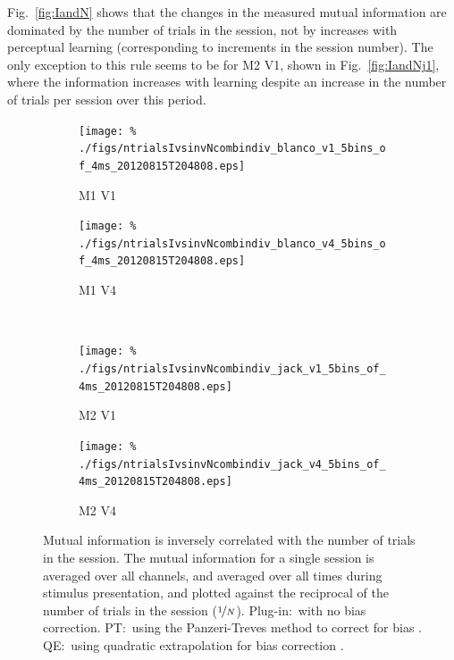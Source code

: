 Fig.~\ref{fig:IandN} shows that the changes in the measured mutual information are dominated by the number of trials in the session, not by increases with perceptual learning (corresponding to increments in the session number).
The only exception to this rule seems to be for M2 V1, shown in Fig.~\ref{fig:IandNj1}, where the information increases with learning despite an increase in the number of trials per session over this period.

% 
% 
\begin{figure}[htbp]
    \begin{subfigure}[b]{0.5\linewidth}
        \centering
        \caption{M1 V1}
        \label{fig:IvNb1}
        \texttt{[image: \%
./figs/ntrialsIvsinvNcombindiv\_blanco\_v1\_5bins\_of\_4ms\_20120815T204808.eps]}
    \end{subfigure}
    \begin{subfigure}[b]{0.5\linewidth}
        \centering
        \caption{M1 V4}
        \label{fig:IvNb4}
        \texttt{[image: \%
./figs/ntrialsIvsinvNcombindiv\_blanco\_v4\_5bins\_of\_4ms\_20120815T204808.eps]}
    \end{subfigure}
    \\
    \begin{subfigure}[b]{0.5\linewidth}
        \centering
        \caption{M2 V1}
        \label{fig:IvNj1}
        \texttt{[image: \%
./figs/ntrialsIvsinvNcombindiv\_jack\_v1\_5bins\_of\_4ms\_20120815T204808.eps]}
    \end{subfigure}
    \begin{subfigure}[b]{0.5\linewidth}
        \centering
        \caption{M2 V4}
        \label{fig:IvNj4}
        \texttt{[image: \%
./figs/ntrialsIvsinvNcombindiv\_jack\_v4\_5bins\_of\_4ms\_20120815T204808.eps]}
    \end{subfigure}
    \caption{Mutual information is inversely correlated with the number of trials in the session. The mutual information for a single session is averaged over all channels, and averaged over all times during stimulus presentation, and plotted against the reciprocal of the number of trials in the session ($\nicefrac{1}{N}$). Plug-in:~with no bias correction. PT:~using the Panzeri-Treves method to correct for bias \cite{Panzeri1996}. QE:~using quadratic extrapolation for bias correction \cite{Strong1998}.
}
    \label{fig:IvN}
\end{figure}

